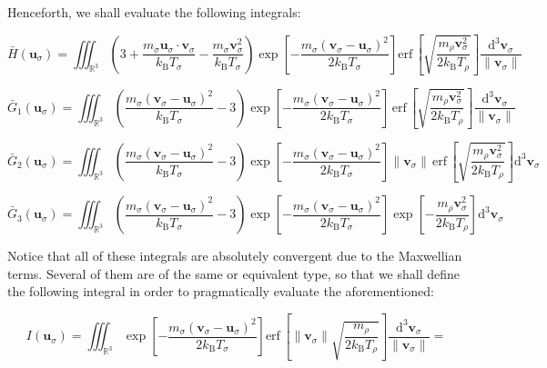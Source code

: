 Henceforth, we shall evaluate the following integrals:

\begin{equation}
    \bar{H}(\mathbf{u}_\sigma)=\iiint_{\mathbb{R}^3}\left(3+\frac{m_\sigma\mathbf{u}_\sigma\cdot\mathbf{v}_\sigma}{k_\mathrm{B}T_\sigma}-\frac{m_\sigma\mathbf{v}_\sigma^2}{k_\mathrm{B}T_\sigma}\right)\exp{\left[-\frac{m_\sigma(\mathbf{v}_\sigma-\mathbf{u}_\sigma)^2}{2k_\mathrm{B}T_\sigma}\right]}\text{erf}\,\left[\sqrt{\frac{m_\rho\mathbf{v}_\sigma^2}{2k_\mathrm{B}T_\rho}}\right]\frac{\mathrm{d}^3\mathbf{v}_\sigma}{\|\mathbf{v}_\sigma\|}
\end{equation}

\begin{equation}
    \bar{G}_1(\mathbf{u}_\sigma)=\iiint_{\mathbb{R}^3}\left(\frac{m_\sigma(\mathbf{v}_\sigma-\mathbf{u}_\sigma)^2}{k_\mathrm{B}T_\sigma}-3\right)\exp{\left[-\frac{m_\sigma(\mathbf{v}_\sigma-\mathbf{u}_\sigma)^2}{2k_\mathrm{B}T_\sigma}\right]}\,\text{erf}\,\left[\sqrt{\frac{m_\rho\mathbf{v}_\sigma^2}{2k_\mathrm{B}T_\rho}}\right]\frac{\mathrm{d}^3\mathbf{v}_\sigma}{\|\mathbf{v}_\sigma\|}
\end{equation}

\begin{equation}
    \bar{G}_2(\mathbf{u}_\sigma)=\iiint_{\mathbb{R}^3}\left(\frac{m_\sigma(\mathbf{v}_\sigma-\mathbf{u}_\sigma)^2}{k_\mathrm{B}T_\sigma}-3\right)\exp{\left[-\frac{m_\sigma(\mathbf{v}_\sigma-\mathbf{u}_\sigma)^2}{2k_\mathrm{B}T_\sigma}\right]}\|\mathbf{v}_\sigma\|\,\text{erf}\,\left[\sqrt{\frac{m_\rho\mathbf{v}_\sigma^2}{2k_\mathrm{B}T_\rho}}\right]\mathrm{d}^3\mathbf{v}_\sigma
\end{equation}

\begin{equation}
    \bar{G}_3(\mathbf{u}_\sigma)=\iiint_{\mathbb{R}^3}\left(\frac{m_\sigma(\mathbf{v}_\sigma-\mathbf{u}_\sigma)^2}{k_\mathrm{B}T_\sigma}-3\right)\exp{\left[-\frac{m_\sigma(\mathbf{v}_\sigma-\mathbf{u}_\sigma)^2}{2k_\mathrm{B}T_\sigma}\right]}\exp{\left[-\frac{m_\rho\mathbf{v}_\sigma^2}{2k_\mathrm{B}T_\rho}\right]}\mathrm{d}^3\mathbf{v}_\sigma
\end{equation}

Notice that all of these integrals are absolutely convergent due to the Maxwellian terms. Several of them are of the same or equivalent type, so that we shall define the following integral in order to pragmatically evaluate the aforementioned:

\begin{equation}
    I(\mathbf{u}_\sigma)=\iiint_{\mathbb{R}^3}\exp{\left[-\frac{m_\sigma(\mathbf{v}_\sigma-\mathbf{u}_\sigma)^2}{2k_\mathrm{B}T_\sigma}\right]}\text{erf}\,\left[\|\mathbf{v}_\sigma\|\sqrt{\frac{m_\rho}{2k_\mathrm{B}T_\rho}}\right]\frac{\mathrm{d}^3\mathbf{v}_\sigma}{\|\mathbf{v}_\sigma\|}=
\end{equation}


